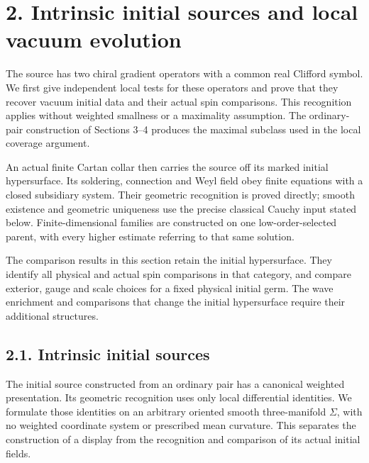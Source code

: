 \documentclass[
  english,
  11pt,
  reqno]{amsart}
\begin{document}
\section{2. Intrinsic initial sources and local vacuum
evolution}\label{intrinsic-initial-sources-and-local-vacuum-evolution}\label{sec:online-intrinsic-source-and-evolution}

The source has two chiral gradient operators with a common real Clifford
symbol. We first give independent local tests for these operators and
prove that they recover vacuum initial data and their actual spin
comparisons. This recognition applies without weighted smallness or a
maximality assumption. The ordinary-pair construction of Sections 3--4
produces the maximal subclass used in the local coverage argument.

An actual finite Cartan collar then carries the source off its marked
initial hypersurface. Its soldering, connection and Weyl field obey
finite equations with a closed subsidiary system. Their geometric
recognition is proved directly; smooth existence and geometric
uniqueness use the precise classical Cauchy input stated below.
Finite-dimensional families are constructed on one low-order-selected
parent, with every higher estimate referring to that same solution.

The comparison results in this section retain the initial hypersurface.
They identify all physical and actual spin comparisons in that category,
and compare exterior, gauge and scale choices for a fixed physical
initial germ. The wave enrichment and comparisons that change the
initial hypersurface require their additional structures.

\subsection{2.1. Intrinsic initial
sources}\label{intrinsic-initial-sources}\label{sec:online-intrinsic-initial-source}

The initial source constructed from an ordinary pair has a canonical
weighted presentation. Its geometric recognition uses only local
differential identities. We formulate those identities on an arbitrary
oriented smooth three-manifold \(\Sigma\), with no weighted coordinate
system or prescribed mean curvature. This separates the construction of
a display from the recognition and comparison of its actual initial
fields.
\end{document}
